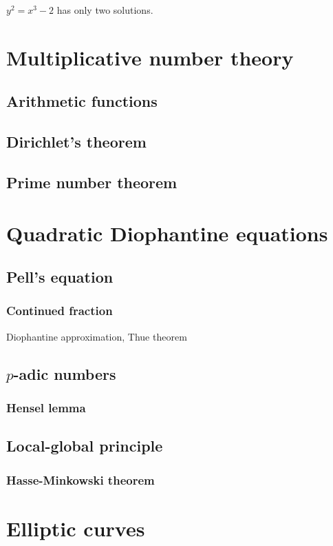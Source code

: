 \documentclass{../note}
\begin{document}
\begin{prb}
\begin{parts}
\item $y^2=x^3-2$ has only two solutions.
\end{parts}
\end{prb}

\part{Multiplicative number theory}
\chapter{Arithmetic functions}
\chapter{Dirichlet's theorem}
\chapter{Prime number theorem}

\part{Quadratic Diophantine equations}
\chapter{Pell's equation}
\section{Continued fraction}
Diophantine approximation, Thue theorem
\chapter{$p$-adic numbers}
\section{Hensel lemma}
\chapter{Local-global principle}
\section{Hasse-Minkowski theorem}

\part{Elliptic curves}
\end{document}
